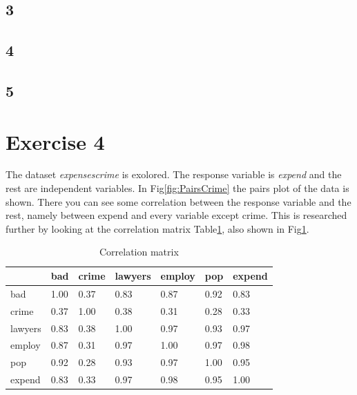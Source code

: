 \documentclass{article}
\begin{document}
    \subsection*{3}
    \subsection*{4}
    \subsection*{5}

  \section*{Exercise 4}
    The dataset \textit{expensescrime} is exolored.
    The response variable is \textit{expend} and the rest are independent variables.
    In Fig\ref{fig:PairsCrime} the pairs plot of the data is shown.
    There you can see some correlation between the response variable and the rest,
    namely between expend and every variable except crime.
    This is researched further by looking at the correlation matrix Table\ref{table:cormatrix}, also shown in Fig\ref{table:cormatrix}.
    \begin{table}[H]
    \begin{center}
    \begin{tabular}{l|llllll}
             & bad & crime & lawyers & employ & pop &expend \\
      \hline
      bad    & 1.00 & 0.37 & 0.83 & 0.87 & 0.92 & 0.83 \\
      crime  & 0.37 & 1.00 & 0.38 & 0.31 & 0.28 & 0.33 \\
      lawyers& 0.83 & 0.38 & 1.00 & 0.97 & 0.93 & 0.97 \\
      employ & 0.87 & 0.31 & 0.97 & 1.00 & 0.97 & 0.98 \\
      pop    & 0.92 & 0.28 & 0.93 & 0.97 & 1.00 & 0.95 \\
      expend & 0.83 & 0.33 & 0.97 & 0.98 & 0.95 & 1.00 \\
    \end{tabular}
    \caption{Correlation matrix}
    \label{table:cormatrix}
    \end{center}
    \end{table}
\end{document}
